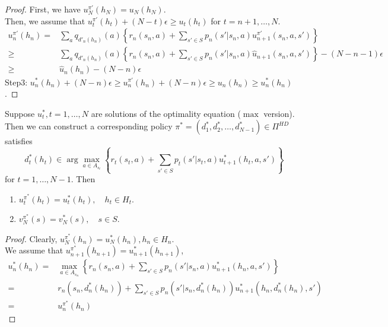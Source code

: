 \begin{definition}
\begin{proof}
        First, we have $ u^{\pi'}_N(h_N) = u_N(h_N) $.\\
        Then, we assume that $ u^{\pi'}_t(h_t) + (N-t) \epsilon \ge u_t(h_t) $ for $ t = n+1, \ldots, N $.
        \begin{align*}
            u^{\pi'}_n(h_n) =& \sum^{}_{a} q_{d'_n(h_n)} (a) \left\{ r_n(s_n, a) + \sum^{}_{s' \in S} p_n(s' | s_n, a) u^{\pi'}_{n+1}(s_n, a, s') \right\}\\
            \ge& \sum^{}_{a} q_{d'_n(h_n)} (a) \left\{ r_n(s_n, a) + \sum^{}_{s' \in S} p_n(s' | s_n, a) \hat u_{n+1}(s_n, a, s') \right\} - (N-n-1)\epsilon\\
            \ge& \hat u_n(h_n) - (N - n) \epsilon
        \end{align*}
        Step3:
        $ u^*_n(h_n) + (N-n) \epsilon \ge u^{\pi'}_n(h_n) + (N-n) \epsilon \ge u_n(h_n) \ge u^*_n(h_n) $.
    \end{proof}
\end{definition}

\begin{theorem}
    Suppose $ u^*_t, t = 1, \ldots, N $ are solutions of the optimality equation ($ \max $ version). 
    Then we can construct a corresponding policy $ \pi^*  = (d^*_1, d^*_2, \ldots, d^*_{N-1}) \in \Pi^{HD}$ satisfies
    \[
        d^*_t(h_t) \in \arg\max_{a \in A_{s_t}} \left\{ r_t(s_t, a) + \sum^{}_{s' \in S} p_t(s' | s_t, a) u^*_{t+1}(h_t, a, s') \right\}
    \]
    for $ t = 1, \ldots, N-1 $.
    Then
    \begin{enumerate}
        \item $ u^{\pi^*}_t(h_t) = u^*_t(h_t), \quad h_t \in H_t $.
        \item $ v^{\pi^*}_N(s) = v^*_N(s), \quad s \in S$.
    \end{enumerate}
    \begin{proof}
        Clearly, $ u^{\pi^*}_N(h_n) = u^*_N(h_n), h_n \in H_n $. \\
        We assume that $ u^{\pi^*}_{n+1}(h_{n+1}) = u^*_{n+1}(h_{n+1}) $, 
        \begin{align*}
            u^*_n(h_n) =& \max_{a \in A_{s_n}} \left\{ r_n(s_n, a) + \sum^{}_{s' \in S} p_n(s' | s_n, a) u^*_{n+1} (h_n, a, s') \right\} \\
            =& r_n(s_n, d^*_n(h_n)) + \sum^{}_{s' \in S} p_n(s' | s_n, d^*_n(h_n)) u^*_{n+1} (h_n, d^*_n(h_n), s')\\
            =& u^{\pi^*}_n(h_n)
        \end{align*}
    \end{proof}
\end{theorem}


